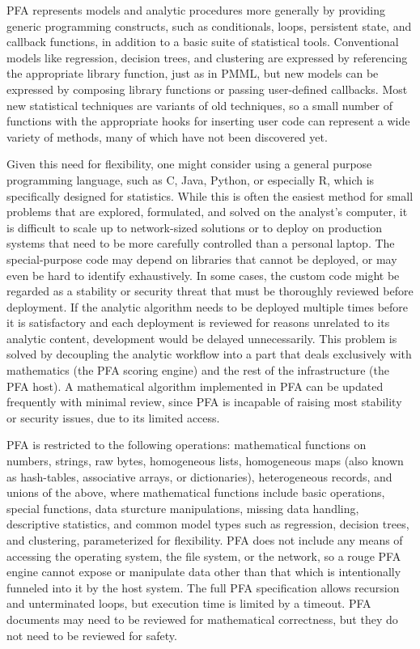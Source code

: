 \documentclass{article}
\begin{document}
PFA represents models and analytic procedures more generally by providing generic programming constructs, such as conditionals, loops, persistent state, and callback functions, in addition to a basic suite of statistical tools.  Conventional models like regression, decision trees, and clustering are expressed by referencing the appropriate library function, just as in PMML, but new models can be expressed by composing library functions or passing user-defined callbacks.  Most new statistical techniques are variants of old techniques, so a small number of functions with the appropriate hooks for inserting user code can represent a wide variety of methods, many of which have not been discovered yet.

Given this need for flexibility, one might consider using a general purpose programming language, such as C, Java, Python, or especially R, which is specifically designed for statistics.  While this is often the easiest method for small problems that are explored, formulated, and solved on the analyst's computer, it is difficult to scale up to network-sized solutions or to deploy on production systems that need to be more carefully controlled than a personal laptop.  The special-purpose code may depend on libraries that cannot be deployed, or may even be hard to identify exhaustively.  In some cases, the custom code might be regarded as a stability or security threat that must be thoroughly reviewed before deployment.  If the analytic algorithm needs to be deployed multiple times before it is satisfactory and each deployment is reviewed for reasons unrelated to its analytic content, development would be delayed unnecessarily.  This problem is solved by decoupling the analytic workflow into a part that deals exclusively with mathematics (the PFA scoring engine) and the rest of the infrastructure (the PFA host).  A mathematical algorithm implemented in PFA can be updated frequently with minimal review, since PFA is incapable of raising most stability or security issues, due to its limited access.

PFA is restricted to the following operations: mathematical functions on numbers, strings, raw bytes, homogeneous lists, homogeneous maps (also known as hash-tables, associative arrays, or dictionaries), heterogeneous records, and unions of the above, where mathematical functions include basic operations, special functions, data sturcture manipulations, missing data handling, descriptive statistics, and common model types such as regression, decision trees, and clustering, parameterized for flexibility.  PFA does not include any means of accessing the operating system, the file system, or the network, so a rouge PFA engine cannot expose or manipulate data other than that which is intentionally funneled into it by the host system.  The full PFA specification allows recursion and unterminated loops, but execution time is limited by a timeout.  PFA documents may need to be reviewed for mathematical correctness, but they do not need to be reviewed for safety.
\end{document}
